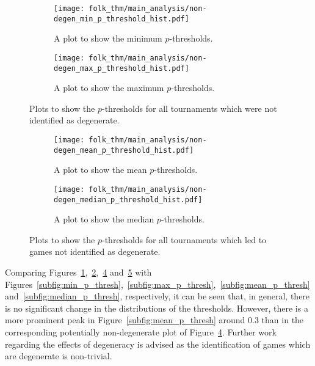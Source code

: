 \begin{figure}
    \centering
    \begin{subfigure}{0.45\textwidth}
        \centering
        \texttt{[image: folk\_thm/main\_analysis/non-degen\_min\_p\_threshold\_hist.pdf]}
        \caption{A plot to show the minimum \(p\)-thresholds.}\label{subfig:non_degen_min_p_thresh}
    \end{subfigure}
    \hspace{3pt}
    \begin{subfigure}{0.45\textwidth}
        \centering
        \texttt{[image: folk\_thm/main\_analysis/non-degen\_max\_p\_threshold\_hist.pdf]}
        \caption{A plot to show the maximum \(p\)-thresholds.}\label{subfig:non_degen_max_p_thresh}
    \end{subfigure}
    \caption{Plots to show the \(p\)-thresholds for all tournaments which were not identified as degenerate.}\label{fig:non_degen_min_max_p_thresh}
\end{figure}


\begin{figure}
    \centering
    \begin{subfigure}{0.45\textwidth}
        \centering
        \texttt{[image: folk\_thm/main\_analysis/non-degen\_mean\_p\_threshold\_hist.pdf]}
        \caption{A plot to show the mean \(p\)-thresholds.}\label{subfig:non_degen_mean_p_thresh}
    \end{subfigure}
    \hspace{3pt}
    \begin{subfigure}{0.45\textwidth}
        \centering
        \texttt{[image: folk\_thm/main\_analysis/non-degen\_median\_p\_threshold\_hist.pdf]}
        \caption{A plot to show the median \(p\)-thresholds.}\label{subfig:non_degen_median_p_thresh}
    \end{subfigure}
    \caption{Plots to show the \(p\)-thresholds for all tournaments which led to games not identified as degenerate.}\label{fig:non_degen_mean_median_p_thresh}
\end{figure}

Comparing Figures~\ref{subfig:non_degen_min_p_thresh},~\ref{subfig:non_degen_max_p_thresh},~\ref{subfig:non_degen_mean_p_thresh}
and~\ref{subfig:non_degen_median_p_thresh} with Figures~\ref{subfig:min_p_thresh},~\ref{subfig:max_p_thresh},~\ref{subfig:mean_p_thresh}
and~\ref{subfig:median_p_thresh}, respectively, it can be seen that, in general,
there is no significant change in the distributions of the thresholds. However,
there is a more prominent peak in Figure~\ref{subfig:mean_p_thresh} around 0.3
than in the corresponding potentially non-degenerate plot of Figure~\ref{subfig:non_degen_mean_p_thresh}. Further work regarding the effects
of degeneracy is advised as the identification of games which are degenerate is non-trivial.

